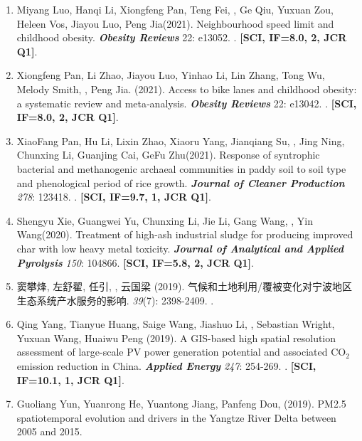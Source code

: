 \begin{enumerate}
\item
    Miyang Luo, Hanqi Li, Xiongfeng Pan, Teng Fei, \Shaoqing, Ge Qiu, Yuxuan Zou, Heleen Vos, Jiayou Luo, Peng Jia\CS (2021).
    Neighbourhood speed limit and childhood obesity.
    \textbf{\textit{Obesity Reviews}} 22: e13052.
    . 
    \textbf{[SCI, IF=8.0, 2, JCR Q1]}.
\item
    Xiongfeng Pan, Li Zhao, Jiayou Luo, Yinhao Li, Lin Zhang, Tong Wu, Melody Smith, \Shaoqing, Peng Jia\CS. (2021).
    Access to bike lanes and childhood obesity: a systematic review and meta‐analysis.
    \textbf{\textit{Obesity Reviews}} 22: e13042.
    . 
    \textbf{[SCI, IF=8.0, 2, JCR Q1]}.
\item
    XiaoFang Pan, Hu Li, Lixin Zhao, Xiaoru Yang, Jianqiang Su, \Shaoqing, Jing Ning, Chunxing Li, Guanjing Cai, GeFu Zhu\CS (2021).
    Response of syntrophic bacterial and methanogenic archaeal communities in paddy soil to soil type and phenological period of rice growth.
    \textbf{\textit{Journal of Cleaner Production}} \textit{278}: 123418.
    .
    \textbf{[SCI, IF=9.7, 1, JCR Q1]}.
\item
    Shengyu Xie, Guangwei Yu\CS, Chunxing Li, Jie Li, Gang Wang, \Shaoqing, Yin Wang\CS (2020).
    Treatment of high-ash industrial sludge for producing improved char with low heavy metal toxicity.
    \textbf{\textit{Journal of Analytical and Applied Pyrolysis}} \textit{150}: 104866.
    \textbf{[SCI, IF=5.8, 2, JCR Q1]}.
\item
    窦攀烽, 左舒翟, 任引, {}, 云国梁 (2019).
    气候和土地利用/覆被变化对宁波地区生态系统产水服务的影响.
    \textbf{} \textit{39}(7): 2398-2409.
    .
    \textbf{}
\item
    Qing Yang\CS, Tianyue Huang, Saige Wang\CS, Jiashuo Li\CS, \Shaoqing, Sebastian Wright, Yuxuan Wang, Huaiwu Peng (2019).
    A GIS-based high spatial resolution assessment of large-scale PV power generation potential and associated CO$_2$ emission reduction in China.
    \textbf{\textit{Applied Energy}} \textit{247}: 254-269.
    .
    \textbf{[SCI, IF=10.1, 1, JCR Q1]}.
\item
    Guoliang Yun, Yuanrong He\CS, Yuantong Jiang, Panfeng Dou, \Shaoqing \enspace (2019).
    PM2.5 spatiotemporal evolution and drivers in the Yangtze River Delta between 2005 and 2015.

\end{enumerate}
